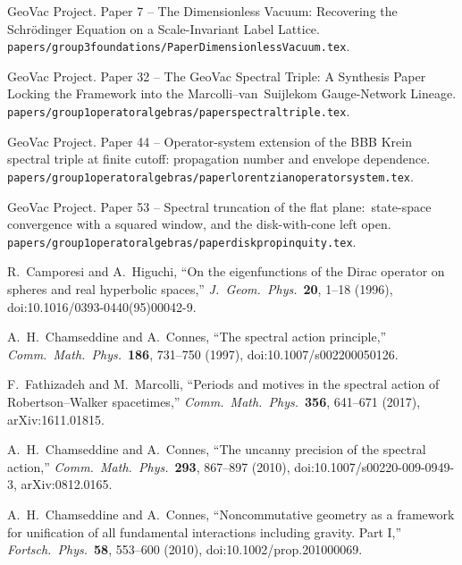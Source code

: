 \documentclass[11pt,a4paper]{article}
\theoremstyle{plain}
\theoremstyle{definition}
\renewcommand{\_}{\textunderscore\allowbreak}
\begin{document}
\begin{thebibliography}{99}

GeoVac Project. Paper 7 -- The Dimensionless Vacuum: Recovering the
Schr\"odinger Equation on a Scale-Invariant Label Lattice.
\texttt{papers/group3\_foundations/Paper\_7\_Dimensionless\_Vacuum.tex}.

GeoVac Project. Paper 32 -- The GeoVac Spectral Triple: A Synthesis
Paper Locking the Framework into the Marcolli--van~Suijlekom
Gauge-Network Lineage.
\texttt{papers/group1\_operator\_algebras/paper\_32\_spectral\_triple.tex}.

GeoVac Project. Paper 44 -- Operator-system extension of the BBB Krein
spectral triple at finite cutoff: propagation number and envelope
dependence.
\texttt{papers/group1\_operator\_algebras/paper\_44\_lorentzian\_operator\_system.tex}.

GeoVac Project. Paper 53 -- Spectral truncation of the flat plane:\
state-space convergence with a squared window, and the disk-with-cone left
open.
\texttt{papers/group1\_operator\_algebras/paper\_53\_disk\_propinquity.tex}.

R.~Camporesi and A.~Higuchi, ``On the eigenfunctions of the Dirac
operator on spheres and real hyperbolic spaces,''
\textit{J.~Geom.~Phys.}\ \textbf{20}, 1--18 (1996),
doi:10.1016/0393-0440(95)00042-9.

A.~H.~Chamseddine and A.~Connes, ``The spectral action principle,''
\textit{Comm.~Math.~Phys.}\ \textbf{186}, 731--750 (1997),
doi:10.1007/s002200050126.

F.~Fathizadeh and M.~Marcolli, ``Periods and motives in the
spectral action of Robertson--Walker spacetimes,''
\textit{Comm.~Math.~Phys.}\ \textbf{356}, 641--671 (2017),
arXiv:1611.01815.

A.~H.~Chamseddine and A.~Connes, ``The uncanny precision of the
spectral action,'' \textit{Comm.~Math.~Phys.}\ \textbf{293}, 867--897
(2010), doi:10.1007/s00220-009-0949-3, arXiv:0812.0165.

A.~H.~Chamseddine and A.~Connes, ``Noncommutative geometry as a
framework for unification of all fundamental interactions
including gravity. Part I,'' \textit{Fortsch.~Phys.}\ \textbf{58}, 553--600
(2010), doi:10.1002/prop.201000069.


\end{thebibliography}
\end{document}
